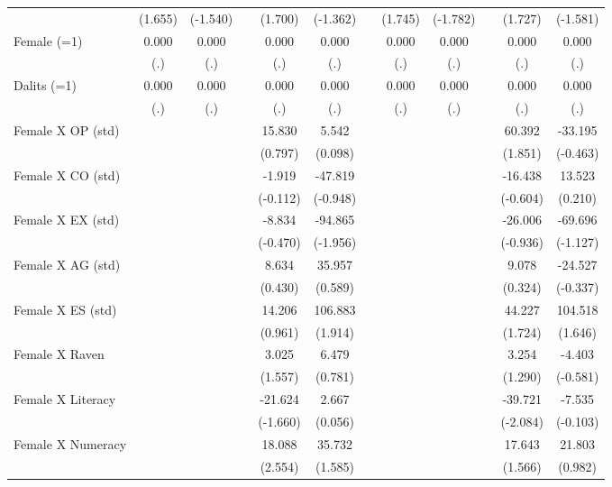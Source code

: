 {\begin{longtable}{@{\extracolsep{\fill}}lccccccccccc}
      & (1.655) & (-1.540) &   & (1.700) & (-1.362) &   & (1.745) & (-1.782) &   & (1.727) & (-1.581) \\
    Female (=1) & 0.000 & 0.000 &   & 0.000 & 0.000 &   & 0.000 & 0.000 &   & 0.000 & 0.000 \\
      & (.) & (.) &   & (.) & (.) &   & (.) & (.) &   & (.) & (.) \\
    Dalits (=1) & 0.000 & 0.000 &   & 0.000 & 0.000 &   & 0.000 & 0.000 &   & 0.000 & 0.000 \\
      & (.) & (.) &   & (.) & (.) &   & (.) & (.) &   & (.) & (.) \\
    Female X OP (std) &   &   &   & 15.830 & 5.542 &   &   &   &   & 60.392 & -33.195 \\
      &   &   &   & (0.797) & (0.098) &   &   &   &   & (1.851) & (-0.463) \\
    Female X CO (std) &   &   &   & -1.919 & -47.819 &   &   &   &   & -16.438 & 13.523 \\
      &   &   &   & (-0.112) & (-0.948) &   &   &   &   & (-0.604) & (0.210) \\
    Female X EX (std) &   &   &   & -8.834 & -94.865 &   &   &   &   & -26.006 & -69.696 \\
      &   &   &   & (-0.470) & (-1.956) &   &   &   &   & (-0.936) & (-1.127) \\
    Female X AG (std) &   &   &   & 8.634 & 35.957 &   &   &   &   & 9.078 & -24.527 \\
      &   &   &   & (0.430) & (0.589) &   &   &   &   & (0.324) & (-0.337) \\
    Female X ES (std) &   &   &   & 14.206 & 106.883 &   &   &   &   & 44.227 & 104.518 \\
      &   &   &   & (0.961) & (1.914) &   &   &   &   & (1.724) & (1.646) \\
    Female X Raven &   &   &   & 3.025 & 6.479 &   &   &   &   & 3.254 & -4.403 \\
      &   &   &   & (1.557) & (0.781) &   &   &   &   & (1.290) & (-0.581) \\
    Female X Literacy &   &   &   & -21.624 & 2.667 &   &   &   &   & -39.721 & -7.535 \\
      &   &   &   & (-1.660) & (0.056) &   &   &   &   & (-2.084) & (-0.103) \\
    Female X Numeracy &   &   &   & 18.088 & 35.732 &   &   &   &   & 17.643 & 21.803 \\
      &   &   &   & (2.554) & (1.585) &   &   &   &   & (1.566) & (0.982) \\

\end{longtable}}
